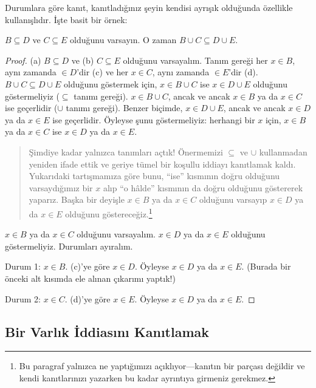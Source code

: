 Durumlara göre kanıt, kanıtladığınız şeyin kendisi ayrışık olduğunda
özellikle kullanışlıdır. İşte basit bir örnek:

\begin{prop}
$B \subseteq D$ ve $C \subseteq E$ olduğunu varsayın. O zaman $B \cup C
\subseteq D \cup E$.
\end{prop}

\begin{proof}
  (a) $B \subseteq D$ ve (b) $C \subseteq E$ olduğunu varsayalım. Tanım
  gereği her $x \in B$, aynı zamanda $\in D$'dir (c) ve her $x \in C$,
  aynı zamanda $\in E$'dir (d). $B \cup C \subseteq D \cup E$ olduğunu
  göstermek için, $x \in B \cup C$ ise $x \in D \cup E$ olduğunu
  göstermeliyiz ($\subseteq$ tanımı gereği). $x \in B \cup C$, ancak ve
  ancak $x \in B$ ya da $x \in C$ ise geçerlidir ($\cup$ tanımı gereği).
  Benzer biçimde, $x \in D \cup E$, ancak ve ancak $x \in D$ ya da $x
  \in E$ ise geçerlidir. Öyleyse şunu göstermeliyiz: herhangi bir $x$
  için, $x \in B$ ya da $x \in C$ ise $x \in D$ ya da $x \in E$.

  \begin{quote}
  Şimdiye kadar yalnızca tanımları açtık!{} Önermemizi $\subseteq$ ve
  $\cup$ kullanmadan yeniden ifade ettik ve geriye tümel bir koşullu
  iddiayı kanıtlamak kaldı. Yukarıdaki tartışmamıza göre bunu, ``ise''
  kısmının doğru olduğunu varsaydığımız bir $x$ alıp ``o hâlde''
  kısmının da doğru olduğunu göstererek yaparız. Başka bir deyişle $x
  \in B$ ya da $x \in C$ olduğunu varsayıp $x \in D$ ya da $x \in E$
  olduğunu göstereceğiz.\footnote{Bu paragraf yalnızca ne yaptığımızı
    açıklıyor---kanıtın bir parçası değildir ve kendi kanıtlarınızı
    yazarken bu kadar ayrıntıya girmeniz gerekmez.}
  \end{quote}

  $x \in B$ ya da $x \in C$ olduğunu varsayalım. $x \in D$ ya da $x \in
  E$ olduğunu göstermeliyiz. Durumları ayıralım.

  Durum 1: $x \in B$. (c)'ye göre $x \in D$. Öyleyse $x \in D$ ya da
  $x \in E$. (Burada bir önceki alt kısımda ele alınan çıkarımı yaptık!)

  Durum 2: $x \in C$. (d)'ye göre $x \in E$. Öyleyse $x \in D$ ya da
  $x \in E$.
 \end{proof}


\subsection{Bir Varlık İddiasını Kanıtlamak}

